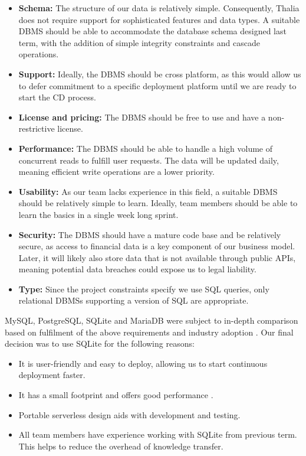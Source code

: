 \documentclass[main.tex]{subfiles}
\begin{document}
\begin {itemize}
    \item \textbf{Schema:} The structure of our data is relatively simple. Consequently, Thalia does not require support for sophisticated features and data types. A suitable DBMS should be able to accommodate the database schema designed last term, with the addition of simple integrity constraints and cascade operations.
    \item \textbf{Support:} Ideally, the DBMS should be cross platform, as this would allow us to defer commitment to a specific deployment platform until we are ready to start the CD process. 
    \item \textbf{License and pricing:} The DBMS should be free to use and have a non-restrictive license.
    \item \textbf{Performance:} The DBMS should be able to handle a high volume of concurrent reads to fulfill user requests. The data will be updated daily, meaning efficient write operations are a lower priority.
    \item \textbf{Usability:} As our team lacks experience in this field, a suitable DBMS should be relatively simple to learn. Ideally, team members should be able to learn the basics in a single week long sprint.
    \item \textbf{Security:} The DBMS should have a mature code base and be relatively secure, as access to financial data is a key component of our business model. Later, it will likely also store data that is not available through public APIs, meaning potential data breaches could expose us to legal liability. \cite{dataprotectionGov}
    \item \textbf{Type:} Since the project constraints specify we use SQL queries, only relational DBMSs supporting a version of SQL are appropriate.
\end{itemize}

MySQL, PostgreSQL, SQLite and MariaDB were subject to in-depth comparison based on fulfilment of the above requirements and industry adoption \cite{dbPerfComparison} \cite{dbmsMarketShare}. Our final decision was to use SQLite for the following reasons:
\begin{itemize}
    \item It is user-friendly and easy to deploy, allowing us to start continuous deployment faster.
    \item It has a small footprint and offers good performance \cite{dbPerfComparison}.
    \item Portable serverless design aids with development and testing.
    \item All team members have experience working with SQLite from previous term. This helps to reduce the overhead of knowledge transfer.
\end{itemize}
\end{document}
